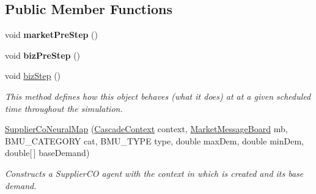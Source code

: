 \subsection*{Public Member Functions}
\begin{DoxyCompactItemize}
\item 
\hypertarget{classuk_1_1ac_1_1dmu_1_1iesd_1_1cascade_1_1agents_1_1aggregators_1_1_supplier_co_neural_map_ac7238297beafa908ed67663093b21d4a}{void {\bfseries market\-Pre\-Step} ()}\label{classuk_1_1ac_1_1dmu_1_1iesd_1_1cascade_1_1agents_1_1aggregators_1_1_supplier_co_neural_map_ac7238297beafa908ed67663093b21d4a}

\item 
\hypertarget{classuk_1_1ac_1_1dmu_1_1iesd_1_1cascade_1_1agents_1_1aggregators_1_1_supplier_co_neural_map_a00cf9c1426554431006fa84e2379bae2}{void {\bfseries biz\-Pre\-Step} ()}\label{classuk_1_1ac_1_1dmu_1_1iesd_1_1cascade_1_1agents_1_1aggregators_1_1_supplier_co_neural_map_a00cf9c1426554431006fa84e2379bae2}

\item 
\hypertarget{classuk_1_1ac_1_1dmu_1_1iesd_1_1cascade_1_1agents_1_1aggregators_1_1_supplier_co_neural_map_aaab1da0e0ef8484bafa3317c906c890f}{void \hyperlink{classuk_1_1ac_1_1dmu_1_1iesd_1_1cascade_1_1agents_1_1aggregators_1_1_supplier_co_neural_map_aaab1da0e0ef8484bafa3317c906c890f}{biz\-Step} ()}\label{classuk_1_1ac_1_1dmu_1_1iesd_1_1cascade_1_1agents_1_1aggregators_1_1_supplier_co_neural_map_aaab1da0e0ef8484bafa3317c906c890f}

\begin{DoxyCompactList}\small\item\em This method defines how this object behaves (what it does) at at a given scheduled time throughout the simulation. \end{DoxyCompactList}\item 
\hyperlink{classuk_1_1ac_1_1dmu_1_1iesd_1_1cascade_1_1agents_1_1aggregators_1_1_supplier_co_neural_map_a4677eb817be685c3148dc8f0c7ed9d4e}{Supplier\-Co\-Neural\-Map} (\hyperlink{classuk_1_1ac_1_1dmu_1_1iesd_1_1cascade_1_1context_1_1_cascade_context}{Cascade\-Context} context, \hyperlink{classuk_1_1ac_1_1dmu_1_1iesd_1_1cascade_1_1market_1_1astem_1_1operators_1_1_market_message_board}{Market\-Message\-Board} mb, B\-M\-U\-\_\-\-C\-A\-T\-E\-G\-O\-R\-Y cat, B\-M\-U\-\_\-\-T\-Y\-P\-E type, double max\-Dem, double min\-Dem, double\mbox{[}$\,$\mbox{]} base\-Demand)
\begin{DoxyCompactList}\small\item\em Constructs a Supplier\-C\-O agent with the context in which is created and its base demand. \end{DoxyCompactList}\end{DoxyCompactItemize}
